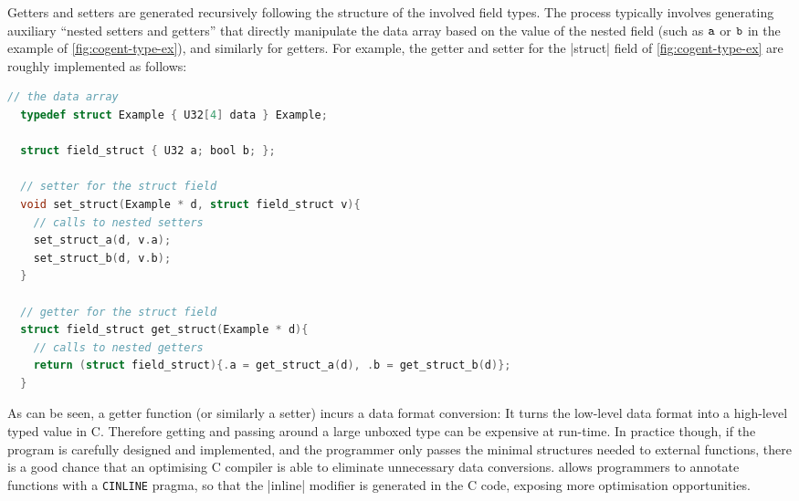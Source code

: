 Getters and setters are generated recursively following the structure of the
involved field types. The process typically involves generating
auxiliary ``nested setters and getters'' that
directly manipulate the data array based on the value of the nested field (such as
$\texttt{a}$ or $\texttt{b}$ in the example of \autoref{fig:cogent-type-ex}), and similarly
for getters.
For example, the getter and setter for the \cg|struct| field of 
\autoref{fig:cogent-type-ex} are roughly implemented as follows:
\begin{lstlisting}[language=C]
  // the data array
  typedef struct Example { U32[4] data } Example;

  struct field_struct { U32 a; bool b; };

  // setter for the struct field
  void set_struct(Example * d, struct field_struct v){
    // calls to nested setters
    set_struct_a(d, v.a);
    set_struct_b(d, v.b);
  } 

  // getter for the struct field
  struct field_struct get_struct(Example * d){
    // calls to nested getters
    return (struct field_struct){.a = get_struct_a(d), .b = get_struct_b(d)};
  } 
 \end{lstlisting}


\noindent As can be seen, a getter function (or similarly a setter) incurs a data format conversion:
It turns the low-level data format into a high-level typed value in C. Therefore
getting and passing around a large unboxed type can be expensive at run-time.
In practice though, if the program is carefully designed and implemented,
and the programmer only passes the minimal structures needed to external
functions, there is a good chance that an optimising C compiler is able to
eliminate unnecessary data conversions. \cogent allows programmers to
annotate functions with a \texttt{CINLINE} pragma, so that the \cc|inline|
modifier is generated in the C code, exposing more optimisation
opportunities. 


